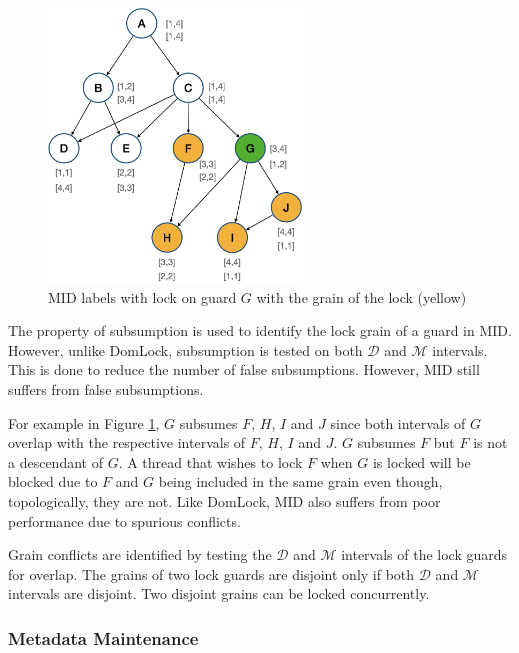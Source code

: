 \begin{figure}[H]
    \centering
    \captionsetup{justification=centering}
    \includegraphics[width=0.6\textwidth]{figures/MID_example_with_lock.png}
    \caption{MID labels with lock on guard $G$ with the grain of the lock (yellow)}
    \label{fig:MID_example_locked}
\end{figure}


The property of subsumption is used to identify the lock grain of a guard in MID. However, unlike DomLock, subsumption is tested on both $\mathcal{D}$ and $\mathcal{M}$ intervals. 
This is done to reduce the number of false subsumptions. However, MID still suffers from false subsumptions.


For example in Figure \ref{fig:MID_example_locked}, $G$ subsumes $F$, $H$, $I$ and $J$ since both intervals of $G$ overlap with the respective intervals of $F$, $H$, $I$ and $J$. $G$ subsumes $F$ but $F$ is not a descendant of $G$. A thread that wishes to lock $F$ when $G$ is locked will be blocked due to $F$ and $G$ being included in the same grain even though, topologically, they are not. Like DomLock, MID also suffers from poor performance due to spurious conflicts.

Grain conflicts are identified by testing the $\mathcal{D}$ and $\mathcal{M}$ intervals of the lock guards for overlap. The grains of two lock guards are disjoint only if both $\mathcal{D}$ and $\mathcal{M}$ intervals are disjoint. Two disjoint grains can be locked concurrently. 

\subsubsection{Metadata Maintenance}

